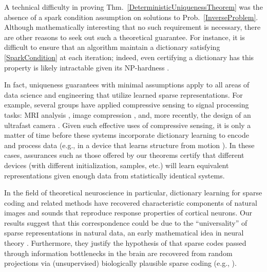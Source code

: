 \documentclass[9pt,twocolumn]{pnas-new}
\begin{document}
A technical difficulty in proving Thm.~\ref{DeterministicUniquenessTheorem} was the absence of a spark condition assumption on solutions to Prob.~\ref{InverseProblem}.
Although mathematically interesting that no such requirement is necessary, there are other reasons to seek out such a theoretical guarantee. For instance, it is difficult to ensure that an algorithm maintain a dictionary satisfying \eqref{SparkCondition} at each iteration; indeed, even certifying a dictionary has this property is likely intractable given its NP-hardness \cite{tillmann2014computational}.

In fact, uniqueness guarantees with minimal assumptions apply to all areas of data science and engineering that utilize learned sparse representations. For example, several groups have applied compressive sensing to signal processing tasks: MRI analysis \cite{lustig2008compressed}, image compression \cite{Duarte08}, and, more recently, the design of an ultrafast camera \cite{Gao14}. Given such effective uses of compressive sensing, it is only a matter of time before these systems incorporate dictionary learning to encode and process data (e.g., in a device that learns structure from motion \cite{kong2016prior}). In these cases, assurances such as those offered by our theorems certify that different devices (with different initialization, samples, etc.) will learn equivalent representations given enough data from statistically identical systems.

In the field of theoretical neuroscience in particular, dictionary learning for sparse coding and related methods have recovered characteristic components of natural images \cite{Olshausen96, hurri1996image, bell1997independent, van1998independent} and sounds \cite{bellsejnowski1996, smithlewicki2006, Carlson12} that reproduce response properties of cortical neurons. Our results suggest that this correspondence could be due to the ``universality'' of sparse representations in natural data, an early mathematical idea in neural theory \cite{pitts1947}. Furthermore, they justify the hypothesis of \cite{Coulter10, Isely10} that sparse codes passed through information bottlenecks in the brain are recovered from random projections via (unsupervised) biologically plausible sparse coding (e.g., \cite{rehnsommer2007, rozell2007neurally, hu2014hebbian}).

 \showacknow %
\end{document}
